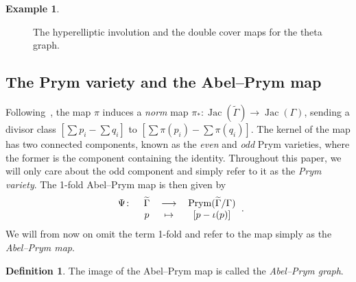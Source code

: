 \documentclass[11pt]{article}
\theoremstyle{definition}
\newtheorem{defi}[theo]{Definition}
\newtheorem{exam}[theo]{Example}
\numberwithin{equation}{section}
\theoremstyle{definition}
\newcommand{\tj}{\widetilde{\jmath}}
\newcommand{\wt}[1]{\widetilde{#1}}
\DeclareMathOperator{\Prym}{Prym}
\DeclareMathOperator{\Jac}{Jac}
\begin{document}
\begin{exam}
\begin{figure}[ht]
 \caption{The hyperelliptic involution and the double cover maps for the theta graph.}
    \label{abel1}
\end{figure}

\end{exam}

\subsection{The Prym variety and the Abel--Prym map}



Following~\cite[Section 1.4]{LenUlirsch_Prym}, the map $\pi$ induces a \emph{norm} map $\pi_*:\Jac(\wt\Gamma)\to\Jac(\Gamma)$, sending a divisor class $[\sum p_i - \sum q_i]$ to $[\sum \pi(p_i) - \sum \pi(q_i)]$. The kernel of the map has two connected components, known as the \emph{even} and \emph{odd}
 Prym varieties, where the former is the component containing the identity.
 Throughout this paper, we will only care about the odd component and simply refer to it as the \emph{Prym variety}.    The 1-fold Abel--Prym map is then given by
 \[
 \begin{tabular}{cccc}	    $\Psi\colon$ & $\wt \Gamma $ & $\longrightarrow$&$\Prym(\wt \Gamma/\Gamma)$  \\
	         &$p$&$\mapsto$&$[p - \iota(p)]$ \\
	    \end{tabular}.
\]
We will from now on omit the term 1-fold and refer to the map simply as the \emph{Abel--Prym map}.

\begin{defi}
    The image of the  Abel--Prym map is called the \emph{Abel--Prym graph}.

\end{defi}
\end{document}

